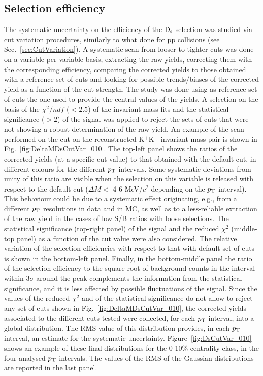 \subsection{Selection efficiency}
\label{sec:CutVarsystAA}
The systematic uncertainty on the efficiency of the ${\rm D_s}$ selection was studied
via cut variation procedures, similarly to what done for pp collisions (see Sec.~\ref{sec:CutVariation}).
A systematic scan from looser to tighter cuts was done on a variable-per-variable 
basis, extracting the raw yields, correcting them with the corresponding efficiency, 
comparing the corrected yields to those obtained 
with a reference set of cuts and looking for possible trends/biases of 
the corrected yield as a function of the cut strength.
The study was done using as reference set of cuts the one used 
to provide the central values of the yields. A selection
on the basis of the $\chi^2/ndf$ ($<2.5$) of the invariant-mass fits and the statistical significance ($>2$)
of the signal was applied to reject the sets of cuts that were not showing a robust 
determination of the raw yield.  
An example of the scan performed on the cut on the
reconstructed K$^+$K$^-$ invariant-mass pair is shown in Fig.~\ref{fig:DeltaMDsCutVar_010}.
The top-left panel shows the ratios of the corrected yields 
(at a specific cut value) to that obtained with the default
cut, in different colours for the different $p_{\rm T}$ intervals.
Some systematic deviations from unity of this ratio are visible when the selection
on this variable is released with respect to the default cut ($\Delta M < $ 4-6 MeV/$c^2$ depending
on the $p_{\rm T}$ interval). 
This behaviour could be due to a systematic effect originating, e.g., from a 
different $p_{\rm T}$ resolutions in data and in MC, as well as to a less-reliable extraction of 
the raw yield in the cases of low S/B ratios with loose selections.
The statistical significance (top-right panel) of the signal and
the reduced $\chi^2$ (middle-top panel) as a function of the cut value were also considered.
The relative variation of the selection
efficiencies with respect to that with default set of cuts is shown in the bottom-left panel.
Finally, in the bottom-middle panel the ratio of the selection efficiency to the square root of 
background counts in the interval within $3\sigma$ around the peak complements 
the information from the statistical significance,
and it is less affected by possible fluctuations of the signal.
Since the values of the reduced $\chi^2$ and of the statistical significance do
not allow to reject any set of cuts shown in Fig.~\ref{fig:DeltaMDsCutVar_010},
the corrected yields associated to the different cuts tested were collected, for each $p_{\rm T}$ interval,
into a global distribution. 
The RMS value of this distribution provides, in each $p_{\rm T}$ interval, an estimate for the systematic uncertainty.
Figure~\ref{fig:DsCutVar_010} shows an example of these final distributions 
for the 0-10\% centrality class, in the four analysed $p_{\rm T}$ intervals. 
The values of the RMS of the Gaussian distributions are reported
in the last panel.


